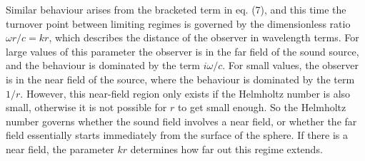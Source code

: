   Similar behaviour arises from the bracketed term in eq. (7), and this time 
  the turnover point between limiting regimes is governed by the dimensionless 
  ratio $\omega r/c = kr$, which describes the distance of the observer in 
  wavelength terms. For large values of this parameter the observer is in the 
  far field of the sound source, and the behaviour is dominated by the term $i 
  \omega /c$. For small values, the observer is in the near field of the 
  source, where the behaviour is dominated by the term $1/r$. However, this 
  near-field region only exists if the Helmholtz number is also small, 
  otherwise it is not possible for $r$ to get small enough. So the Helmholtz 
  number governs whether the sound field involves a near field, or whether the 
  far field essentially starts immediately from the surface of the sphere. If 
  there is a near field, the parameter $kr$ determines how far out this regime 
  extends. 